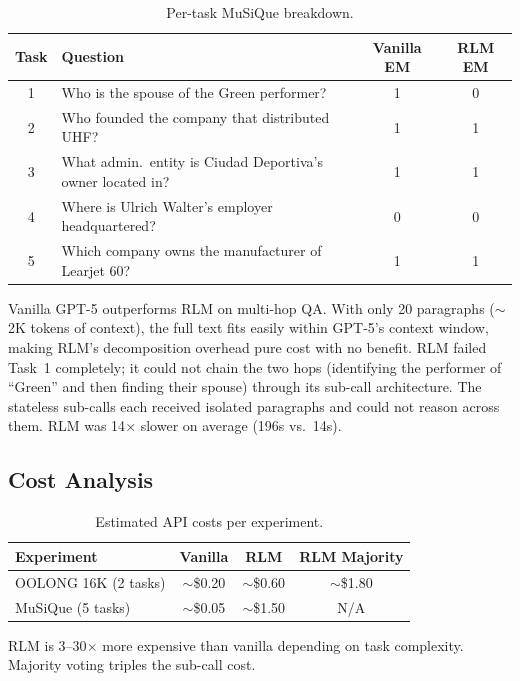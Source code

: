 \documentclass[11pt]{article}
\begin{document}
\begin{table}[h]
\centering
\small
\begin{tabular}{clcc}
\toprule
\textbf{Task} & \textbf{Question} & \textbf{Vanilla EM} & \textbf{RLM EM} \\
\midrule
1 & Who is the spouse of the Green performer? & 1 & 0 \\
2 & Who founded the company that distributed UHF? & 1 & 1 \\
3 & What admin.\ entity is Ciudad Deportiva's owner located in? & 1 & 1 \\
4 & Where is Ulrich Walter's employer headquartered? & 0 & 0 \\
5 & Which company owns the manufacturer of Learjet 60? & 1 & 1 \\
\bottomrule
\end{tabular}
\caption{Per-task MuSiQue breakdown.}
\label{tab:musique-tasks}
\end{table}

Vanilla GPT-5 outperforms RLM on multi-hop QA. With only 20 paragraphs ($\sim$2K tokens of context), the full text fits easily within GPT-5's context window, making RLM's decomposition overhead pure cost with no benefit. RLM failed Task~1 completely; it could not chain the two hops (identifying the performer of ``Green'' and then finding their spouse) through its sub-call architecture. The stateless sub-calls each received isolated paragraphs and could not reason across them. RLM was 14$\times$ slower on average (196s vs.\ 14s).

\subsection{Cost Analysis}

\begin{table}[h]
\centering
\begin{tabular}{lccc}
\toprule
\textbf{Experiment} & \textbf{Vanilla} & \textbf{RLM} & \textbf{RLM Majority} \\
\midrule
OOLONG 16K (2 tasks) & $\sim$\$0.20 & $\sim$\$0.60 & $\sim$\$1.80 \\
MuSiQue (5 tasks) & $\sim$\$0.05 & $\sim$\$1.50 & N/A \\
\bottomrule
\end{tabular}
\caption{Estimated API costs per experiment.}
\label{tab:cost}
\end{table}

RLM is 3--30$\times$ more expensive than vanilla depending on task complexity. Majority voting triples the sub-call cost.
\end{document}
